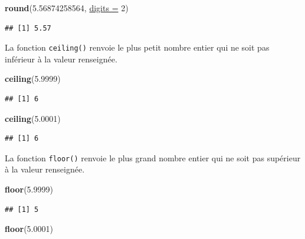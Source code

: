 \documentclass[twoside,symmetric]{book}
\newenvironment{Shaded}{}{}
\newcommand{\DataTypeTok}[1]{\underline{#1}}
\newcommand{\DecValTok}[1]{#1}
\newcommand{\FloatTok}[1]{#1}
\newcommand{\KeywordTok}[1]{\textbf{#1}}
\newcommand{\NormalTok}[1]{#1}
\begin{document}
\begin{Shaded}
\begin{Highlighting}[]
\KeywordTok{round}\NormalTok{(}\FloatTok{5.56874258564}\NormalTok{, }\DataTypeTok{digits =} \DecValTok{2}\NormalTok{)}
\end{Highlighting}
\end{Shaded}

\begin{verbatim}
## [1] 5.57
\end{verbatim}

La fonction \texttt{ceiling()} renvoie le plus petit nombre entier qui ne soit pas inférieur à la valeur renseignée.

\begin{Shaded}
\begin{Highlighting}[]
\KeywordTok{ceiling}\NormalTok{(}\FloatTok{5.9999}\NormalTok{)}
\end{Highlighting}
\end{Shaded}

\begin{verbatim}
## [1] 6
\end{verbatim}

\begin{Shaded}
\begin{Highlighting}[]
\KeywordTok{ceiling}\NormalTok{(}\FloatTok{5.0001}\NormalTok{)}
\end{Highlighting}
\end{Shaded}

\begin{verbatim}
## [1] 6
\end{verbatim}

La fonction \texttt{floor()} renvoie le plus grand nombre entier qui ne soit pas supérieur à la valeur renseignée.

\begin{Shaded}
\begin{Highlighting}[]
\KeywordTok{floor}\NormalTok{(}\FloatTok{5.9999}\NormalTok{)}
\end{Highlighting}
\end{Shaded}

\begin{verbatim}
## [1] 5
\end{verbatim}

\begin{Shaded}
\begin{Highlighting}[]
\KeywordTok{floor}\NormalTok{(}\FloatTok{5.0001}\NormalTok{)}
\end{Highlighting}
\end{Shaded}
\end{document}
